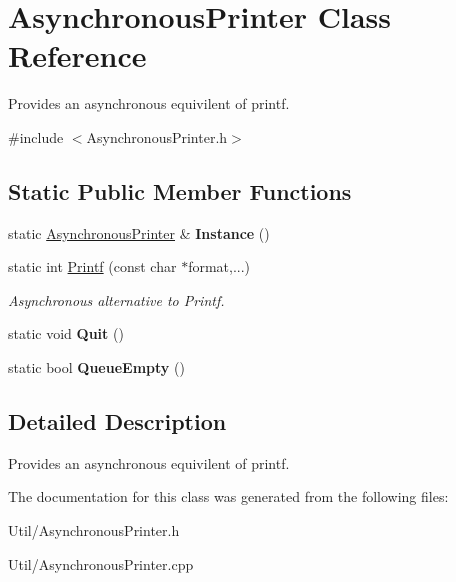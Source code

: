 \hypertarget{class_asynchronous_printer}{\section{\-Asynchronous\-Printer \-Class \-Reference}
\label{class_asynchronous_printer}
}


\-Provides an asynchronous equivilent of printf.  




{\ttfamily \#include $<$\-Asynchronous\-Printer.\-h$>$}

\subsection*{\-Static \-Public \-Member \-Functions}
\begin{DoxyCompactItemize}
\item 
\hypertarget{class_asynchronous_printer_ab1553ae0b41d933f38a8e8439f687b42}{static \hyperlink{class_asynchronous_printer}{\-Asynchronous\-Printer} \& {\bfseries \-Instance} ()}\label{class_asynchronous_printer_ab1553ae0b41d933f38a8e8439f687b42}

\item 
\hypertarget{class_asynchronous_printer_a0ef1c5904f24fd48fda1e724f4f0f68f}{static int \hyperlink{class_asynchronous_printer_a0ef1c5904f24fd48fda1e724f4f0f68f}{\-Printf} (const char $\ast$format,...)}\label{class_asynchronous_printer_a0ef1c5904f24fd48fda1e724f4f0f68f}

\begin{DoxyCompactList}\small\item\em \-Asynchronous alternative to \-Printf. \end{DoxyCompactList}\item 
\hypertarget{class_asynchronous_printer_af42d841d7d5c70f34e81c98a212478b6}{static void {\bfseries \-Quit} ()}\label{class_asynchronous_printer_af42d841d7d5c70f34e81c98a212478b6}

\item 
\hypertarget{class_asynchronous_printer_af56a3f2c43c68f55495fc7ffd1025c1e}{static bool {\bfseries \-Queue\-Empty} ()}\label{class_asynchronous_printer_af56a3f2c43c68f55495fc7ffd1025c1e}

\end{DoxyCompactItemize}


\subsection{\-Detailed \-Description}
\-Provides an asynchronous equivilent of printf. 

\-The documentation for this class was generated from the following files\-:\begin{DoxyCompactItemize}
\item 
\-Util/\-Asynchronous\-Printer.\-h\item 
\-Util/\-Asynchronous\-Printer.\-cpp\end{DoxyCompactItemize}
